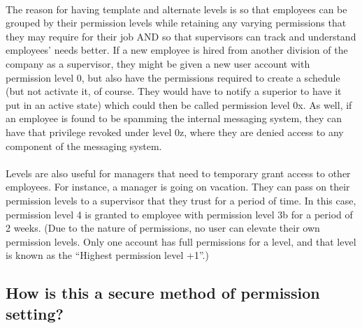 \documentclass[letterpaper,12pt]{report}
\begin{document}
\paragraph*{}\hspace{0.6cm}The reason for having template and alternate levels is so that employees can be grouped by their permission levels while retaining any varying permissions that they may require for their job AND so that supervisors can track and understand employees' needs better. If a new employee is hired from another division of the company as a supervisor, they might be given a new user account with permission level 0, but also have the permissions required to create a schedule (but not activate it, of course. They would have to notify a superior to have it put in an active state) which could then be called permission level 0x. As well, if an employee is found to be spamming the internal messaging system, they can have that privilege revoked under level 0z, where they are denied access to any component of the messaging system.
\paragraph*{}\hspace{0.6cm}Levels are also useful for managers that need to temporary grant access to other employees. For instance, a manager is going on vacation. They can pass on their permission levels to a supervisor that they trust for a period of time. In this case, permission level 4 is granted to employee with permission level 3b for a period of 2 weeks. (Due to the nature of permissions, no user can elevate their own permission levels. Only one account has full permissions for a level, and that level is known as the “Highest permission level +1”.)
\pagebreak
\subsection*{How is this a secure method of permission setting?}
\end{document}
